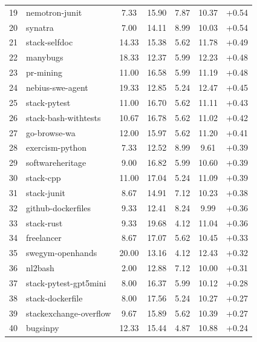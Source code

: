 \documentclass{article}
\begin{document}
\begin{table}[!htbp]
\begin{tabular}{rlccccc}
19 & nemotron-junit                 &  7.33 & 15.90 &  7.87 & 10.37 & +0.54 \\
20 & synatra                        &  7.00 & 14.11 &  8.99 & 10.03 & +0.54 \\
21 & stack-selfdoc                  & 14.33 & 15.38 &  5.62 & 11.78 & +0.49 \\
22 & manybugs                       & 18.33 & 12.37 &  5.99 & 12.23 & +0.48 \\
23 & pr-mining                      & 11.00 & 16.58 &  5.99 & 11.19 & +0.48 \\
24 & nebius-swe-agent               & 19.33 & 12.85 &  5.24 & 12.47 & +0.45 \\
25 & stack-pytest                   & 11.00 & 16.70 &  5.62 & 11.11 & +0.43 \\
26 & stack-bash-withtests           & 10.67 & 16.78 &  5.62 & 11.02 & +0.42 \\
27 & go-browse-wa                   & 12.00 & 15.97 &  5.62 & 11.20 & +0.41 \\
28 & exercism-python                &  7.33 & 12.52 &  8.99 &  9.61 & +0.39 \\
29 & softwareheritage               &  9.00 & 16.82 &  5.99 & 10.60 & +0.39 \\
30 & stack-cpp                      & 11.00 & 17.04 &  5.24 & 11.09 & +0.39 \\
31 & stack-junit                    &  8.67 & 14.91 &  7.12 & 10.23 & +0.38 \\
32 & github-dockerfiles             &  9.33 & 12.41 &  8.24 &  9.99 & +0.36 \\
33 & stack-rust                     &  9.33 & 19.68 &  4.12 & 11.04 & +0.36 \\
34 & freelancer                     &  8.67 & 17.07 &  5.62 & 10.45 & +0.33 \\
35 & swegym-openhands               & 20.00 & 13.16 &  4.12 & 12.43 & +0.32 \\
36 & nl2bash                        &  2.00 & 12.88 &  7.12 & 10.00 & +0.31 \\
37 & stack-pytest-gpt5mini          &  8.00 & 16.37 &  5.99 & 10.12 & +0.28 \\
38 & stack-dockerfile               &  8.00 & 17.56 &  5.24 & 10.27 & +0.27 \\
39 & stackexchange-overflow         &  9.67 & 15.89 &  5.62 & 10.39 & +0.27 \\
40 & bugsinpy                       & 12.33 & 15.44 &  4.87 & 10.88 & +0.24 \\

\end{tabular}
\end{table}
\end{document}
